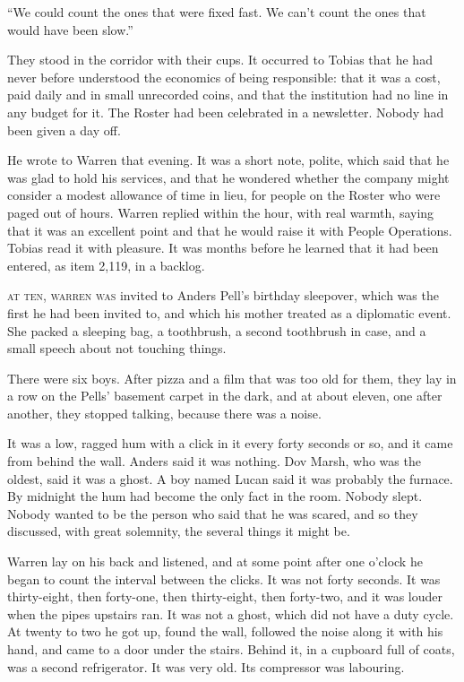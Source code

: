 ``We could count the ones that were fixed fast. We can't count the ones that would have been slow.''

They stood in the corridor with their cups. It occurred to Tobias that he had never before understood the economics of being responsible: that it was a cost, paid daily and in small unrecorded coins, and that the institution had no line in any budget for it. The Roster had been celebrated in a newsletter. Nobody had been given a day off.

He wrote to Warren that evening. It was a short note, polite, which said that he was glad to hold his services, and that he wondered whether the company might consider a modest allowance of time in lieu, for people on the Roster who were paged out of hours. Warren replied within the hour, with real warmth, saying that it was an excellent point and that he would raise it with People Operations. Tobias read it with pleasure. It was months before he learned that it had been entered, as item 2,119, in a backlog.


\textsc{at ten, warren was} invited to Anders Pell's birthday sleepover, which was the first he had been invited to, and which his mother treated as a diplomatic event. She packed a sleeping bag, a toothbrush, a second toothbrush in case, and a small speech about not touching things.

There were six boys. After pizza and a film that was too old for them, they lay in a row on the Pells' basement carpet in the dark, and at about eleven, one after another, they stopped talking, because there was a noise.

It was a low, ragged hum with a click in it every forty seconds or so, and it came from behind the wall. Anders said it was nothing. Dov Marsh, who was the oldest, said it was a ghost. A boy named Lucan said it was probably the furnace. By midnight the hum had become the only fact in the room. Nobody slept. Nobody wanted to be the person who said that he was scared, and so they discussed, with great solemnity, the several things it might be.

Warren lay on his back and listened, and at some point after one o'clock he began to count the interval between the clicks. It was not forty seconds. It was thirty-eight, then forty-one, then thirty-eight, then forty-two, and it was louder when the pipes upstairs ran. It was not a ghost, which did not have a duty cycle. At twenty to two he got up, found the wall, followed the noise along it with his hand, and came to a door under the stairs. Behind it, in a cupboard full of coats, was a second refrigerator. It was very old. Its compressor was labouring.

